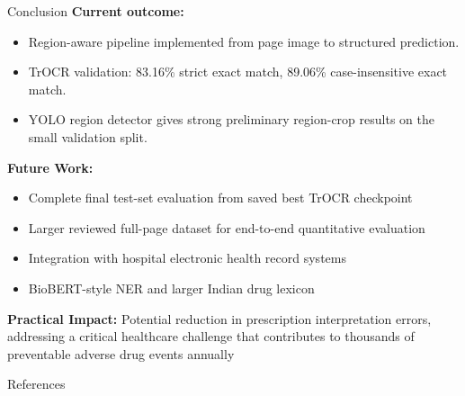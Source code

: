 \documentclass{beamer}
\begin{document}
\begin{frame}{Conclusion}
\textbf{Current outcome:}
\begin{itemize}
    \item Region-aware pipeline implemented from page image to structured prediction.
    \item TrOCR validation: 83.16\% strict exact match, 89.06\% case-insensitive exact match.
    \item YOLO region detector gives strong preliminary region-crop results on the small validation split.
\end{itemize}

\textbf{Future Work:}
\begin{itemize}
    \item Complete final test-set evaluation from saved best TrOCR checkpoint
    \item Larger reviewed full-page dataset for end-to-end quantitative evaluation
    \item Integration with hospital electronic health record systems
    \item BioBERT-style NER and larger Indian drug lexicon
\end{itemize}

\textbf{Practical Impact:} Potential reduction in prescription interpretation errors, addressing a critical healthcare challenge that contributes to thousands of preventable adverse drug events annually~\cite{bhuiyan2022online}
\end{frame}

\begin{frame}[allowframebreaks]{References}


\end{frame}
\end{document}
